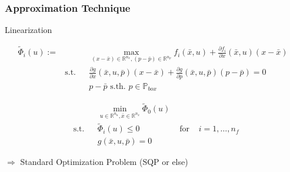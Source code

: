 \begin{frame}
	\frametitle{Approximation Technique}

\begin{block}{Linearization}
	
	\begin{align*}
	\tilde{\Phi}_{i}(u):= &&& \max_{(x-\bar{x})\in\mathbb{R}^{n_{x}}, (p-\bar{p})\in\mathbb{R}^{n_{p}}} f_{i}(\bar{x}, u)+\frac{\partial f_{i}}{\partial x}(\bar{x}, u)(x-\bar{x}) \\
	& \text{s.t.} && \frac{\partial g}{\partial x}(\bar{x}, u, \bar{p})(x-\bar{x})+\frac{\partial g}{\partial p}(\bar{x}, u, \bar{p})(p-\bar{p})=0 \\
	&&& p-\bar{p} \text{ s.th. } p\in\mathbb{P}_{box}
	\end{align*}
	
\end{block}	
	

	
\begin{block}	

\begin{align*}
&&&\min_{u\in\mathbb{R}^{n_{u}}, \bar{x}\in\mathbb{R}^{n_{x}}} \tilde{\Phi}_{0}(u)\\
&\text{s.t.} &&  \tilde{\Phi}_{i}(u)\leq 0 & \text{ for } & i=1,\ldots,n_{f}\\
&&& g(\bar{x}, u, \bar{p})=0
\end{align*}
\end{block} 
	
$\Rightarrow$ Standard Optimization Problem (SQP or else)

\end{frame}
